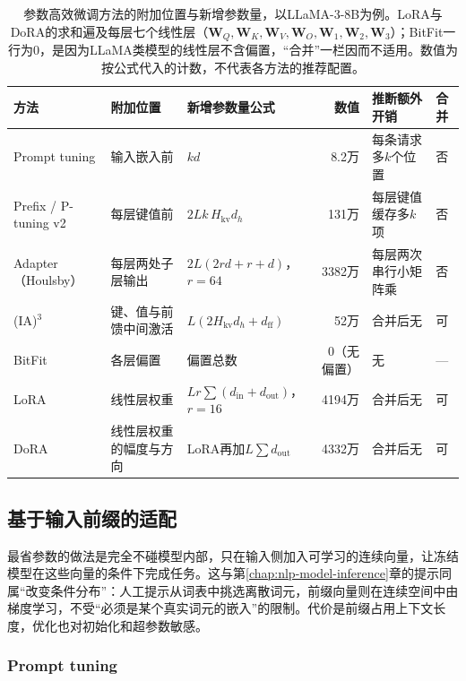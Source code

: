 \begin{table}[htbp]
  \small
  \begin{tabularx}{\linewidth}{@{}p{22mm}p{27mm}p{38mm}rXp{10mm}@{}}
    \toprule
    方法 & 附加位置 & 新增参数量公式 & 数值 & 推断额外开销 & 合并\\
    \midrule
    Prompt tuning & 输入嵌入前 & $kd$ & 8.2万 & 每条请求多$k$个位置 & 否\\
    Prefix / P-tuning v2 & 每层键值前 & $2Lk\,H_{\mathrm{kv}}d_h$ & 131万 & 每层键值缓存多$k$项 & 否\\
    Adapter（Houlsby） & 每层两处子层输出 & $2L(2rd+r+d)$，$r=64$ & 3382万 & 每层两次串行小矩阵乘 & 否\\
    (IA)$^3$ & 键、值与前馈中间激活 & $L(2H_{\mathrm{kv}}d_h+d_{\mathrm{ff}})$ & 52万 & 合并后无 & 可\\
    BitFit & 各层偏置 & 偏置总数 & 0（无偏置） & 无 & ---\\
    LoRA & 线性层权重 & $Lr\sum(d_{\mathrm{in}}+d_{\mathrm{out}})$，$r=16$ & 4194万 & 合并后无 & 可\\
    DoRA & 线性层权重的幅度与方向 & LoRA再加$L\sum d_{\mathrm{out}}$ & 4332万 & 合并后无 & 可\\
    \bottomrule
  \end{tabularx}
  \caption{参数高效微调方法的附加位置与新增参数量，以LLaMA-3-8B为例。LoRA与DoRA的求和遍及每层七个线性层（$\bm W_Q,\bm W_K,\bm W_V,\bm W_O,\bm W_1,\bm W_2,\bm W_3$）；BitFit一行为0，是因为LLaMA类模型的线性层不含偏置，“合并”一栏因而不适用。数值为按公式代入的计数，不代表各方法的推荐配置。}
  \label{tab:nlp-sft-peft-positions}
\end{table}

\subsection{基于输入前缀的适配}
\label{sec:nlp-sft-prefix}

最省参数的做法是完全不碰模型内部，只在输入侧加入可学习的连续向量，让冻结模型在这些向量的条件下完成任务。这与第\ref{chap:nlp-model-inference}章的提示同属“改变条件分布”：人工提示从词表中挑选离散词元，前缀向量则在连续空间中由梯度学习，不受“必须是某个真实词元的嵌入”的限制。代价是前缀占用上下文长度，优化也对初始化和超参数敏感。

\subsubsection{Prompt tuning}
\label{sec:nlp-sft-prompt-tuning}

